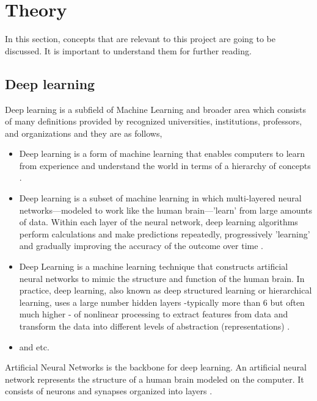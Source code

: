 \documentclass[a4paper,4pt]{article}
\begin{document}
\section{Theory}
In this section, concepts that are relevant to this project are going to be discussed. It is important to understand them for further
reading.
\subsection{Deep learning}
Deep learning is a subfield of Machine Learning and broader area which consists of many definitions provided by recognized 
universities, institutions, professors, and organizations and they are as follows,
\begin{itemize}
    \item Deep learning is a form of machine learning that enables computers to learn from experience and understand the
    world in terms of a hierarchy of concepts \cite{goodfellow2016deep}.
    \item Deep learning is a subset of machine learning in which multi-layered neural networks—modeled to work like the human 
    brain—'learn' from large amounts of data. Within each layer of the neural network, deep learning algorithms perform 
    calculations and make predictions repeatedly, progressively 'learning' and gradually improving the accuracy of the outcome 
    over time \cite{ibmDeepLearning}.
    \item Deep Learning is a machine learning technique that constructs artificial neural networks to mimic the structure and 
    function of the human brain. In practice, deep learning, also known as deep structured learning or hierarchical learning, 
    uses a large number hidden layers -typically more than 6 but often much higher - of nonlinear processing to extract features 
    from data and transform the data into different levels of abstraction (representations) \cite{deepAiDeepLearning}.
    \item and etc.
\end{itemize}
Artificial Neural Networks is the backbone for deep learning. An artificial neural network represents the structure of a human 
brain modeled on the computer. It consists of neurons and synapses organized into layers \cite{ann}.
\end{document}
